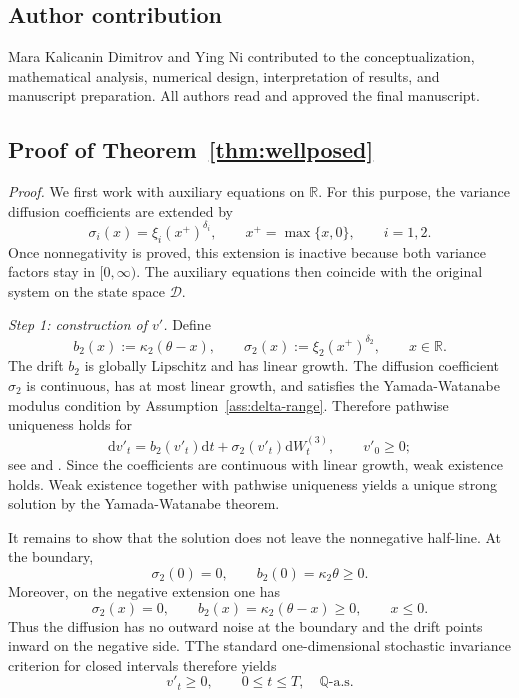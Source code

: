 \documentclass[pdflatex,sn-mathphys-num]{sn-jnl}
\theoremstyle{thmstyleone}%
\theoremstyle{thmstylethree}%
\theoremstyle{thmstyletwo}%
\newcommand{\dd}{\mathrm d}
\newcommand{\Q}{\mathbb Q}
\newcommand{\R}{\mathbb R}
\begin{document}
\subsection*{Author contribution}
Mara Kalicanin Dimitrov and Ying Ni contributed to the conceptualization, mathematical analysis, numerical design, interpretation of results, and manuscript preparation. All authors read and approved the final manuscript.
\begin{appendices}

\section{Proof of Theorem~\ref{thm:wellposed}}\label{app:proof-wellposed}

\noindent\textit{Proof.}
We first work with auxiliary equations on $\R$. For this purpose, the variance diffusion coefficients are extended by
$$
\sigma_i(x)=\xi_i(x^+)^{\delta_i},\qquad
x^+=\max\{x,0\},\qquad i=1,2.
$$
Once nonnegativity is proved, this extension is inactive because both variance factors stay in $[0,\infty)$. The auxiliary equations then coincide with the original system on the state space $\mathcal D$.

\emph{Step 1: construction of $v'$.}
Define
$$
b_2(x):=\kappa_2(\theta-x),\qquad
\sigma_2(x):=\xi_2(x^+)^{\delta_2},\qquad x\in\R.
$$
The drift $b_2$ is globally Lipschitz and has linear growth. The diffusion coefficient $\sigma_2$ is continuous, has at most linear growth, and satisfies the Yamada-Watanabe modulus condition by Assumption~\ref{ass:delta-range}. Therefore pathwise uniqueness holds for
$$
\dd v'_t=b_2(v'_t)\dd t+\sigma_2(v'_t)\dd W^{(3)}_t,
\qquad v'_0\ge0;
$$
see \cite{yamada1971uniqueness} and \cite[Ch.~5]{karatzas1991brownian}. Since the coefficients are continuous with linear growth, weak existence holds. Weak existence together with pathwise uniqueness yields a unique strong solution by the Yamada-Watanabe theorem.

It remains to show that the solution does not leave the nonnegative half-line. At the boundary,
$$
\sigma_2(0)=0,\qquad b_2(0)=\kappa_2\theta\ge0.
$$
Moreover, on the negative extension one has
$$
\sigma_2(x)=0,\qquad b_2(x)=\kappa_2(\theta-x)\ge0,\qquad x\le0.
$$
Thus the diffusion has no outward noise at the boundary and the drift points inward on the negative side. TThe standard one-dimensional stochastic invariance criterion for closed intervals therefore yields
$$
v'_t\ge0,\qquad 0\le t\le T,\quad \Q\text{-a.s.}
$$


\end{appendices}
\end{document}
